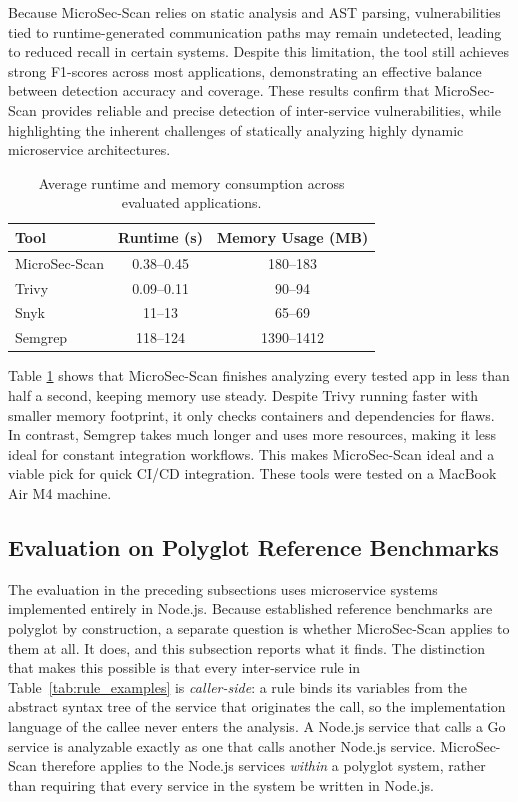 \documentclass[preprint,12pt]{elsarticle}
\newcommand{\new}[1]{#1}
\newcommand{\safefixtablestyle}{%
  \small
  \setlength{\tabcolsep}{5pt}
  \renewcommand{\arraystretch}{1.15}
}
\begin{document}
Because MicroSec-Scan relies on static analysis and AST parsing, vulnerabilities tied to runtime-generated communication paths may remain undetected, leading to reduced recall in certain systems. Despite this limitation, the tool still achieves strong F1-scores across most applications, demonstrating an effective balance between detection accuracy and coverage. These results confirm that MicroSec-Scan provides reliable and precise detection of inter-service vulnerabilities, while highlighting the inherent challenges of statically analyzing highly dynamic microservice architectures.

\begin{table}[!t]
\centering
\caption{Average runtime and memory consumption across evaluated applications.}
\label{tab:resource_consumption}
\safefixtablestyle
\begin{tabular}{@{} l c c @{}}
\toprule
\textbf{Tool} & \textbf{Runtime (s)} & \textbf{Memory Usage (MB)} \\
\midrule
MicroSec-Scan & 0.38--0.45 & 180--183 \\
Trivy & 0.09--0.11 & 90--94 \\
Snyk & 11--13 & 65--69 \\
Semgrep & 118--124 & 1390--1412 \\
\bottomrule
\end{tabular}
\end{table}


Table \ref{tab:resource_consumption} shows that MicroSec-Scan finishes analyzing every tested app in less than half a second, keeping memory use steady. Despite Trivy running faster with smaller memory footprint, it only checks containers and dependencies for flaws. In contrast, Semgrep takes much longer and uses more resources, making it less ideal for constant integration workflows.
This makes MicroSec-Scan ideal and a viable pick for quick CI/CD integration. These tools were tested on a MacBook Air M4 machine.



\subsection{\new{Evaluation on Polyglot Reference Benchmarks}}
\label{sec:polyglot_eval}

\new{The evaluation in the preceding subsections uses microservice systems
implemented entirely in Node.js. Because established reference benchmarks are
polyglot by construction, a separate question is whether MicroSec-Scan applies
to them at all. It does, and this subsection reports what it finds. The
distinction that makes this possible is that every inter-service rule in
Table~\ref{tab:rule_examples} is \emph{caller-side}: a rule binds its
variables from the abstract syntax tree of the service that originates the
call, so the implementation language of the callee never enters the analysis.
A Node.js service that calls a Go service is analyzable exactly as one that
calls another Node.js service. MicroSec-Scan therefore applies to the Node.js
services \emph{within} a polyglot system, rather than requiring that every
service in the system be written in Node.js.}
\end{document}
